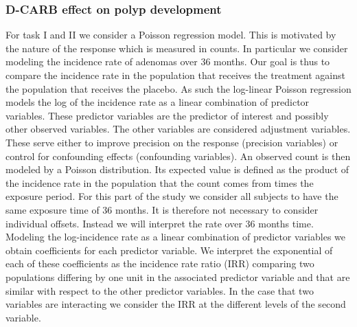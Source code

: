 \documentclass[paper=a4, fontsize=11pt]{scrartcl} %
\numberwithin{equation}{section} %
\numberwithin{figure}{section} %
\numberwithin{table}{section} %
\begin{document}
\subsubsection{D-CARB effect on polyp development}
\label{sec:methods_model_i_ii}
For task I and II we consider a Poisson regression model. This is motivated by the nature of the response which is measured in counts. In particular we consider modeling the incidence rate of adenomas over 36 months. Our goal is thus to compare the incidence rate in the population that receives the treatment against the population that receives the placebo. As such the log-linear Poisson regression models the log of the incidence rate as a linear combination of predictor variables. These predictor variables are the predictor of interest and possibly other observed variables. The other variables are considered adjustment variables. These serve either to improve precision on the response (precision variables) or control for confounding effects (confounding variables). An observed count is then modeled by a Poisson distribution. Its expected value is defined as the product of the incidence rate in the population that the count comes from times the exposure period. For this part of the study we consider all subjects to have the same exposure time of 36 months. It is therefore not necessary to consider individual offsets. Instead we will interpret the rate over 36 months time.\\
Modeling the log-incidence rate as a linear combination of predictor variables we obtain coefficients for each predictor variable. We interpret the exponential of each of these coefficients as the incidence rate ratio (IRR) comparing two populations differing by one unit in the associated predictor variable and that are similar with respect to the other predictor variables. In the case that two variables are interacting we consider the IRR at the different levels of the second variable.\\
\end{document}
